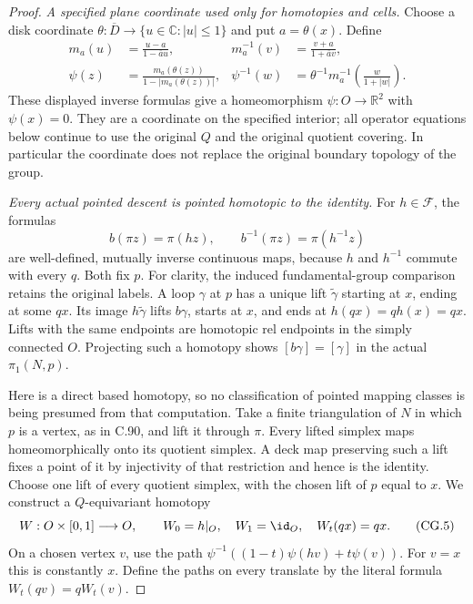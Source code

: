 \begin{proof}
\emph{A specified plane coordinate used only for homotopies and cells.}
Choose a disk coordinate
$\theta:\overline D\to\{u\in\mathbb C:|u|\leq1\}$ and put
$a=\theta(x)$.  Define
\[
 \begin{aligned}
 m_a(u)&=\frac{u-a}{1-\overline a u},
       &m_a^{-1}(v)&=\frac{v+a}{1+\overline a v},\\
 \psi(z)&=\frac{m_a(\theta(z))}{1-|m_a(\theta(z))|},
       &\psi^{-1}(w)&=
          \theta^{-1}m_a^{-1}\!\left(\frac{w}{1+|w|}\right).
 \end{aligned}                                                    \tag{CG.3}
\]
These displayed inverse formulas give a homeomorphism
$\psi:O\to\mathbb R^2$ with $\psi(x)=0$.
They are a coordinate on the specified interior; all operator
equations below continue to use the original $Q$ and the
original quotient covering.  In particular the coordinate
does not replace the original boundary topology of the group.

\emph{Every actual pointed descent is pointed homotopic to the identity.}
For $h\in\mathscr F$, the formulas
\[
             b(\pi z)=\pi(hz),\qquad
             b^{-1}(\pi z)=\pi(h^{-1}z)                         \tag{CG.4}
\]
are well-defined, mutually inverse continuous maps, because
$h$ and $h^{-1}$ commute with every $q$.  Both fix $p$.
For clarity, the induced fundamental-group comparison retains
the original labels.  A loop $\gamma$ at $p$ has a unique lift
$\widetilde\gamma$ starting at $x$, ending at some $qx$.
Its image $h\widetilde\gamma$ lifts $b\gamma$, starts at $x$,
and ends at $h(qx)=qh(x)=qx$.  Lifts with the same endpoints
are homotopic rel endpoints in the simply connected $O$.
Projecting such a homotopy shows
$[b\gamma]=[\gamma]$ in the actual $\pi_1(N,p)$.

Here is a direct based homotopy, so no classification of
pointed mapping classes is being presumed from that computation.
Take a finite triangulation of $N$ in which $p$ is a vertex,
as in C.90, and lift it through $\pi$.
Every lifted simplex maps homeomorphically onto its quotient
simplex.  A deck map preserving such a lift fixes a point
of it by injectivity of that restriction and hence is the
identity.  Choose one lift of every quotient simplex,
with the chosen lift of $p$ equal to $x$.
We construct a $Q$-equivariant homotopy
\[
 W:O\times[0,1]\longrightarrow O,
 \qquad W_0=h|_O,\quad W_1=\id_O,\quad W_t(qx)=qx.            \tag{CG.5}
\]
On a chosen vertex $v$, use the path
$\psi^{-1}((1-t)\psi(hv)+t\psi(v))$.
For $v=x$ this is constantly $x$.
Define the paths on every translate by the literal formula
$W_t(qv)=qW_t(v)$.


\end{proof}
